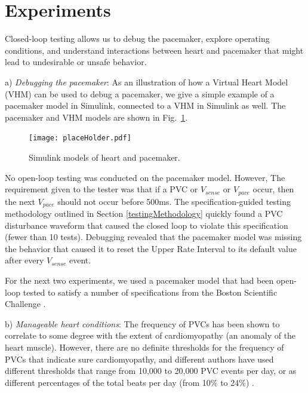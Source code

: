 \section{Experiments}
\label{experiments}

Closed-loop testing allows us to debug the pacemaker, explore operating conditions, and understand interactions between heart and pacemaker that might lead to undesirable or unsafe behavior.

a) \emph{Debugging the pacemaker}: As an illustration of how a Virtual Heart Model (VHM) can be used to debug a pacemaker, we give a simple example of a pacemaker model in Simulink, connected to a VHM in Simulink as well. 
The pacemaker and VHM models are shown in Fig.~\ref{fig:simulinkModels}.
\begin{figure}[tb]
	\centering
	\texttt{[image: placeHolder.pdf]}
	\caption{Simulink models of heart and pacemaker.}
	\label{fig:simulinkModels}
\end{figure}
No open-loop testing was conducted on the pacemaker model.
However, 
The requirement given to the tester was that if a PVC or $V_{sense}$ or $V_{pace}$ occur, then the next $V_{pace}$ should not occur before 500ms. 
The specification-guided testing methodology outlined in Section \ref{testingMethodology} quickly found a PVC disturbance waveform that caused the closed loop to violate this specification (fewer than 10 tests).
Debugging revealed that the pacemaker model was missing the behavior that caused it to reset the Upper Rate Interval to its default value after every $V_{sense}$ event.

For the next two experiments, we used a pacemaker model that had been open-loop tested to satisfy a number of specifications from the Boston Scientific Challenge \cite{challenge}.

b) \emph{Manageable heart conditions}: 
The frequency of PVCs has been shown to correlate to some degree with the extent of cardiomyopathy (an anomaly of the heart muscle).
However, there are no definite thresholds for the frequency of PVCs that indicate sure cardiomyopathy, and different authors have used different thresholds that range from 10,000 to 20,000 PVC events per day, or as different percentages of the total beats per day (from 10\% to 24\%) \cite{ChaLKG12_PVC}.

